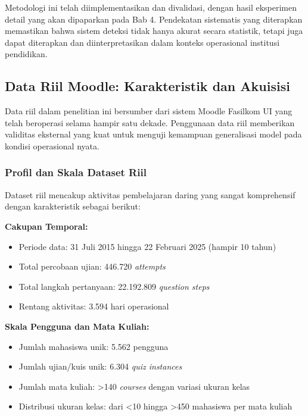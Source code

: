 Metodologi ini telah diimplementasikan dan divalidasi, dengan hasil eksperimen detail yang akan dipaparkan pada Bab 4. Pendekatan sistematis yang diterapkan memastikan bahwa sistem deteksi tidak hanya akurat secara statistik, tetapi juga dapat diterapkan dan diinterpretasikan dalam konteks operasional institusi pendidikan.

\subsection{Data Riil Moodle: Karakteristik dan Akuisisi}
\label{sec:dataRiilMoodle}

Data riil dalam penelitian ini bersumber dari sistem Moodle Fasilkom UI yang telah beroperasi selama hampir satu dekade. Penggunaan data riil memberikan validitas eksternal yang kuat untuk menguji kemampuan generalisasi model pada kondisi operasional nyata.

\subsubsection{Profil dan Skala Dataset Riil}
\label{sec:profilDatasetRiil}

Dataset riil mencakup aktivitas pembelajaran daring yang sangat komprehensif dengan karakteristik sebagai berikut:

\textbf{Cakupan Temporal:}
\begin{itemize}
    \item Periode data: 31 Juli 2015 hingga 22 Februari 2025 (hampir 10 tahun)
    \item Total percobaan ujian: 446.720 \textit{attempts}
    \item Total langkah pertanyaan: 22.192.809 \textit{question steps}
    \item Rentang aktivitas: 3.594 hari operasional
\end{itemize}

\textbf{Skala Pengguna dan Mata Kuliah:}
\begin{itemize}
    \item Jumlah mahasiswa unik: 5.562 pengguna
    \item Jumlah ujian/kuis unik: 6.304 \textit{quiz instances}
    \item Jumlah mata kuliah: >140 \textit{courses} dengan variasi ukuran kelas
    \item Distribusi ukuran kelas: dari <10 hingga >450 mahasiswa per mata kuliah
\end{itemize}

